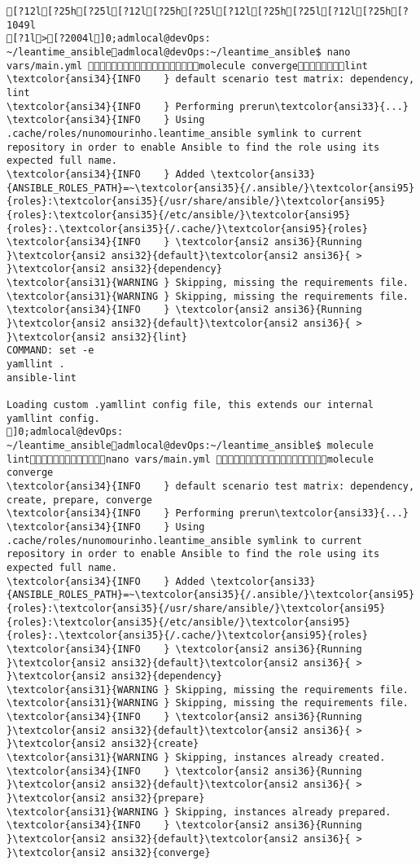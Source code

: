 \documentclass{scrartcl}
\begin{document}
\begin{Verbatim}
[?12l[?25h[?25l[?12l[?25h[?25l[?12l[?25h[?25l[?12l[?25h[?1049l
[?1l>[?2004l]0;admlocal@devOps: ~/leantime_ansibleadmlocal@devOps:~/leantime_ansible$ nano vars/main.yml molecule convergelint
\textcolor{ansi34}{INFO    } default scenario test matrix: dependency, lint
\textcolor{ansi34}{INFO    } Performing prerun\textcolor{ansi33}{...}
\textcolor{ansi34}{INFO    } Using .cache/roles/nunomourinho.leantime_ansible symlink to current repository in order to enable Ansible to find the role using its expected full name.
\textcolor{ansi34}{INFO    } Added \textcolor{ansi33}{ANSIBLE_ROLES_PATH}=~\textcolor{ansi35}{/.ansible/}\textcolor{ansi95}{roles}:\textcolor{ansi35}{/usr/share/ansible/}\textcolor{ansi95}{roles}:\textcolor{ansi35}{/etc/ansible/}\textcolor{ansi95}{roles}:.\textcolor{ansi35}{/.cache/}\textcolor{ansi95}{roles}
\textcolor{ansi34}{INFO    } \textcolor{ansi2 ansi36}{Running }\textcolor{ansi2 ansi32}{default}\textcolor{ansi2 ansi36}{ > }\textcolor{ansi2 ansi32}{dependency}
\textcolor{ansi31}{WARNING } Skipping, missing the requirements file.
\textcolor{ansi31}{WARNING } Skipping, missing the requirements file.
\textcolor{ansi34}{INFO    } \textcolor{ansi2 ansi36}{Running }\textcolor{ansi2 ansi32}{default}\textcolor{ansi2 ansi36}{ > }\textcolor{ansi2 ansi32}{lint}
COMMAND: set -e
yamllint .
ansible-lint

Loading custom .yamllint config file, this extends our internal yamllint config.
]0;admlocal@devOps: ~/leantime_ansibleadmlocal@devOps:~/leantime_ansible$ molecule lintnano vars/main.yml molecule converge
\textcolor{ansi34}{INFO    } default scenario test matrix: dependency, create, prepare, converge
\textcolor{ansi34}{INFO    } Performing prerun\textcolor{ansi33}{...}
\textcolor{ansi34}{INFO    } Using .cache/roles/nunomourinho.leantime_ansible symlink to current repository in order to enable Ansible to find the role using its expected full name.
\textcolor{ansi34}{INFO    } Added \textcolor{ansi33}{ANSIBLE_ROLES_PATH}=~\textcolor{ansi35}{/.ansible/}\textcolor{ansi95}{roles}:\textcolor{ansi35}{/usr/share/ansible/}\textcolor{ansi95}{roles}:\textcolor{ansi35}{/etc/ansible/}\textcolor{ansi95}{roles}:.\textcolor{ansi35}{/.cache/}\textcolor{ansi95}{roles}
\textcolor{ansi34}{INFO    } \textcolor{ansi2 ansi36}{Running }\textcolor{ansi2 ansi32}{default}\textcolor{ansi2 ansi36}{ > }\textcolor{ansi2 ansi32}{dependency}
\textcolor{ansi31}{WARNING } Skipping, missing the requirements file.
\textcolor{ansi31}{WARNING } Skipping, missing the requirements file.
\textcolor{ansi34}{INFO    } \textcolor{ansi2 ansi36}{Running }\textcolor{ansi2 ansi32}{default}\textcolor{ansi2 ansi36}{ > }\textcolor{ansi2 ansi32}{create}
\textcolor{ansi31}{WARNING } Skipping, instances already created.
\textcolor{ansi34}{INFO    } \textcolor{ansi2 ansi36}{Running }\textcolor{ansi2 ansi32}{default}\textcolor{ansi2 ansi36}{ > }\textcolor{ansi2 ansi32}{prepare}
\textcolor{ansi31}{WARNING } Skipping, instances already prepared.
\textcolor{ansi34}{INFO    } \textcolor{ansi2 ansi36}{Running }\textcolor{ansi2 ansi32}{default}\textcolor{ansi2 ansi36}{ > }\textcolor{ansi2 ansi32}{converge}


\end{Verbatim}
\end{document}
